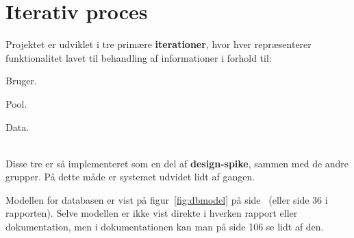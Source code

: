 \section{Iterativ proces}


Projektet er udviklet i tre primære \textbf{iterationer}, hvor hver repræsenterer funktionalitet lavet til behandling af informationer i forhold til:
\\

\begin{enumerate*}
	\item Bruger.
	\item Pool.
	\item Data.
\end{enumerate*}
\\

Disse tre er så implementeret som en del af \textbf{design-spike}, sammen med de andre grupper. På dette måde er systemet udvidet lidt af gangen. 

Modellen for databasen er vist på figur~\ref{fig:dbmodel} på side~\pageref{fig:dbmodel} (eller side 36 i rapporten). Selve modellen er ikke vist direkte i hverken rapport eller dokumentation, men i dokumentationen kan man på side 106 se lidt af den.

